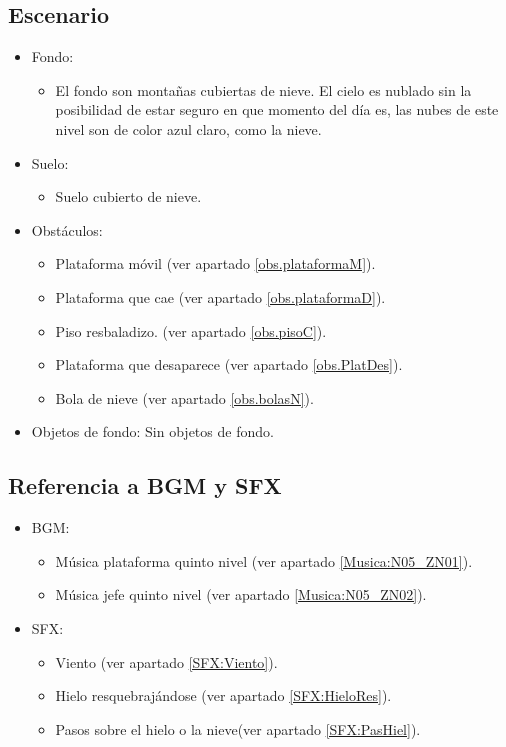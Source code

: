         \subsection{Escenario}
\begin{itemize} 
        \item Fondo:
\begin{itemize} 
        \item El fondo son montañas cubiertas de nieve. El cielo es nublado sin la posibilidad de estar seguro en que momento del día es, las nubes de este nivel son de color azul claro, como la nieve.
\end{itemize} 
        \item Suelo:
\begin{itemize} 
        \item Suelo cubierto de nieve.
\end{itemize} 
        \item Obstáculos:
        \begin{itemize} 
			\item Plataforma móvil (ver apartado \ref{obs.plataformaM}).
			\item Plataforma que cae (ver apartado \ref{obs.plataformaD}).
			\item Piso resbaladizo. (ver apartado \ref{obs.pisoC}).
			\item Plataforma que desaparece (ver apartado \ref{obs.PlatDes}).
			\item Bola de nieve (ver apartado \ref{obs.bolasN}).
		\end{itemize}
        \item Objetos de fondo: Sin objetos de fondo.
\end{itemize}   
        \subsection{Referencia a BGM y SFX}
\begin{itemize} 
        \item BGM:
\begin{itemize} 
        \item Música plataforma quinto nivel (ver apartado \ref{Musica:N05_ZN01}).
        \item Música jefe quinto nivel (ver apartado \ref{Musica:N05_ZN02}).
\end{itemize}
        \item SFX:
\begin{itemize} 
        \item Viento (ver apartado \ref{SFX:Viento}).
        \item Hielo resquebrajándose (ver apartado \ref{SFX:HieloRes}).
        \item Pasos sobre el hielo o la nieve(ver apartado \ref{SFX:PasHiel}).	
\end{itemize}
\end{itemize}

